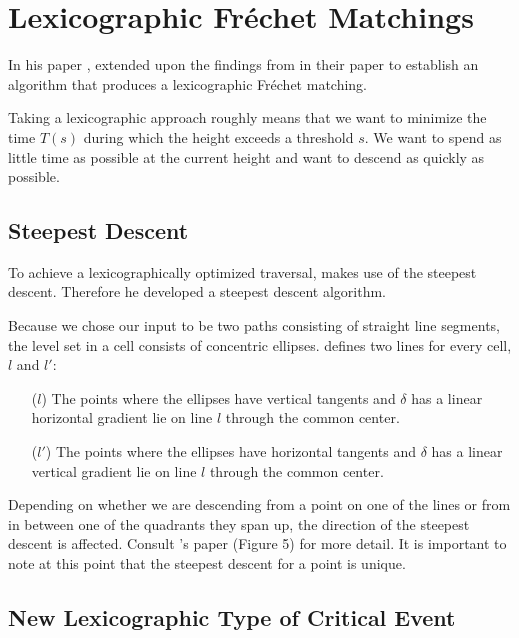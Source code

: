 \section{Lexicographic Fréchet Matchings}

In his \citeyear{rotelex} paper , \citeauthor{rotelex} extended upon the findings from \citeauthor*{altgodau} in their paper  to establish an algorithm that produces a lexicographic Fréchet matching.

Taking a lexicographic approach roughly means that we want to minimize the time $T(s)$ during which the height exceeds a threshold $s$.\cite{rotelex} We want to spend as little time as possible at the current height and want to descend as quickly as possible.

\subsection{Steepest Descent}

To achieve a lexicographically optimized traversal, \citeauthor{rotelex} makes use of the steepest descent. Therefore he developed a steepest descent algorithm.

Because we chose our input to be two paths consisting of straight line segments, the level set in a cell consists of concentric ellipses. \citeauthor{rotelex} defines two lines for every cell, $l$ and $l'$:

\begin{itemize}
	\item [($l$)] The points where the ellipses have vertical tangents and $\delta$ has a linear horizontal gradient lie on line $l$ through the common center.\cite{rotelex}
	\item [($l'$)] The points where the ellipses have horizontal tangents and $\delta$ has a linear vertical gradient lie on line $l$ through the common center.\cite{rotelex}
\end{itemize}

Depending on whether we are descending from a point on one of the lines or from in between one of the quadrants they span up, the direction of the steepest descent is affected. Consult \citeauthor{rotelex}'s paper \cite{rotelex} (Figure 5) for more detail. It is important to note at this point that the steepest descent for a point is unique.


\subsection{New Lexicographic Type of Critical Event}

